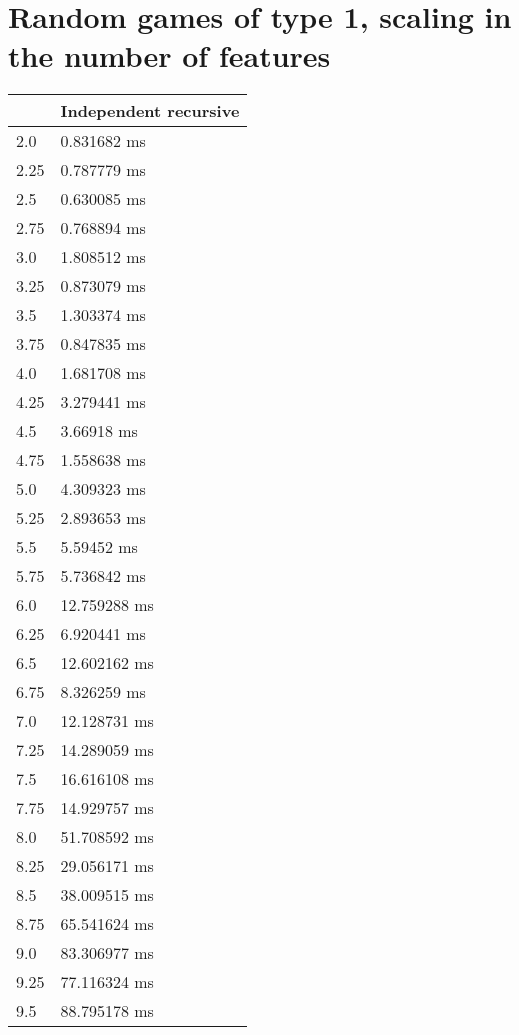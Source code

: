\section{Random games of type 1, scaling in the number of features}
\begin{multicols}{2}
	\begin{tabular}{|l|l|}
		\hline
		& Independent recursive \\ \hline
		2.0 & 0.831682 ms \\ \hline
		2.25 & 0.787779 ms \\ \hline
		2.5 & 0.630085 ms \\ \hline
		2.75 & 0.768894 ms \\ \hline
		3.0 & 1.808512 ms \\ \hline
		3.25 & 0.873079 ms \\ \hline
		3.5 & 1.303374 ms \\ \hline
		3.75 & 0.847835 ms \\ \hline
		4.0 & 1.681708 ms \\ \hline
		4.25 & 3.279441 ms \\ \hline
		4.5 & 3.66918 ms \\ \hline
		4.75 & 1.558638 ms \\ \hline
		5.0 & 4.309323 ms \\ \hline
		5.25 & 2.893653 ms \\ \hline
		5.5 & 5.59452 ms \\ \hline
		5.75 & 5.736842 ms \\ \hline
		6.0 & 12.759288 ms \\ \hline
		6.25 & 6.920441 ms \\ \hline
		6.5 & 12.602162 ms \\ \hline
		6.75 & 8.326259 ms \\ \hline
		7.0 & 12.128731 ms \\ \hline
		7.25 & 14.289059 ms \\ \hline
		7.5 & 16.616108 ms \\ \hline
		7.75 & 14.929757 ms \\ \hline
		8.0 & 51.708592 ms \\ \hline
		8.25 & 29.056171 ms \\ \hline
		8.5 & 38.009515 ms \\ \hline
		8.75 & 65.541624 ms \\ \hline
		9.0 & 83.306977 ms \\ \hline
		9.25 & 77.116324 ms \\ \hline
		9.5 & 88.795178 ms \\ \hline

\end{tabular}
\end{multicols}
